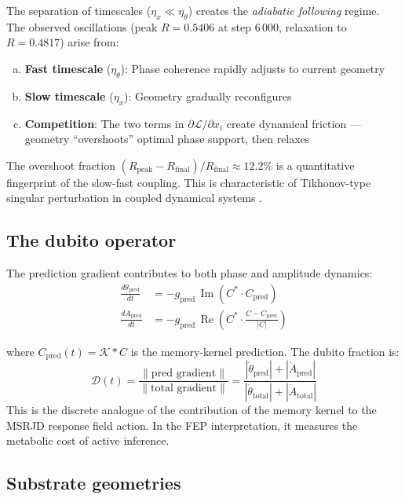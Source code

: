 \documentclass[12pt,a4paper]{article}
\theoremstyle{plain}
\theoremstyle{definition}
\begin{document}
The separation of timescales ($\eta_x \ll \eta_\theta$) creates the
\emph{adiabatic following} regime. The observed oscillations (peak
$R = 0.5406$ at step 6\,000, relaxation to $R = 0.4817$) arise from:
\begin{enumerate}[(a)]
  \item \textbf{Fast timescale} ($\eta_\theta$): Phase coherence rapidly
        adjusts to current geometry
  \item \textbf{Slow timescale} ($\eta_x$): Geometry gradually reconfigures
  \item \textbf{Competition}: The two terms in
        $\partial\mathcal{L}/\partial x_i$ create dynamical friction ---
        geometry ``overshoots'' optimal phase support, then relaxes
\end{enumerate}
The overshoot fraction
$(R_{\text{peak}} - R_{\text{final}})/R_{\text{final}} \approx 12.2\%$
is a quantitative fingerprint of the slow-fast coupling. This is
characteristic of Tikhonov-type singular perturbation in coupled dynamical
systems \citep{tikhonov1952}.

\subsection{The dubito operator}

The prediction gradient contributes to both phase and amplitude dynamics:
\begin{align}
\frac{d\theta_{\text{pred}}}{dt}
  &= -g_{\text{pred}}\,\operatorname{Im}(C^* \cdot C_{\text{pred}}) \\
\frac{dA_{\text{pred}}}{dt}
  &= -g_{\text{pred}}\,\operatorname{Re}\!\left(C^* \cdot
     \frac{C - C_{\text{pred}}}{|C|}\right)
\end{align}

where $C_{\text{pred}}(t) = \mathcal{K} * C$ is the memory-kernel
prediction. The dubito fraction is:
\begin{equation}
\mathcal{D}(t)
  = \frac{\|\text{pred gradient}\|}{\|\text{total gradient}\|}
  = \frac{|\dot\theta_{\text{pred}}| + |\dot A_{\text{pred}}|}
         {|\dot\theta_{\text{total}}| + |\dot A_{\text{total}}|}
\end{equation}
This is the discrete analogue of the contribution of the memory kernel
to the MSRJD response field action. In the FEP interpretation, it
measures the metabolic cost of active inference.

\subsection{Substrate geometries}
\end{document}
